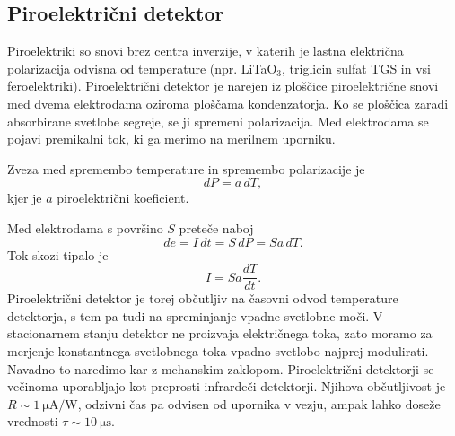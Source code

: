 \subsection*{Piroelektrični detektor}
Piroelektriki so snovi brez centra inverzije, 
v katerih je lastna električna 
polarizacija odvisna od temperature (npr. LiTaO$_3$, 
triglicin sulfat TGS in vsi feroelektriki). Piroelektrični detektor je narejen iz 
ploščice piroelektrične snovi med dvema elektrodama oziroma ploščama kondenzatorja.
Ko se ploščica zaradi absorbirane svetlobe segreje, se ji spremeni polarizacija. Med 
elektrodama se pojavi premikalni tok, ki ga merimo na merilnem uporniku.

Zveza med spremembo temperature in spremembo polarizacije je
\begin{equation}
dP = a\, dT,
\end{equation}
kjer je $a$ piroelektrični koeficient. 

Med elektrodama s površino $S$ preteče naboj
\begin{equation}
de = I\, dt = S\, dP = S a\, dT.
\end{equation}
Tok skozi tipalo je
\begin{equation}
I = S a \frac{dT}{dt}.
\label{piro}
\end{equation}
Piroelektrični detektor je torej občutljiv na časovni odvod temperature detektorja, 
s tem pa tudi na spreminjanje vpadne svetlobne moči. V stacionarnem stanju 
detektor ne proizvaja električnega toka, zato moramo za merjenje 
konstantnega svetlobnega toka vpadno svetlobo najprej modulirati.
Navadno to naredimo kar z mehanskim zaklopom. Piroelektrični detektorji
se večinoma uporabljajo kot preprosti infrardeči detektorji.
Njihova občutljivost je $R \sim 1~\si{\micro\ampere/\watt}$, odzivni čas pa odvisen od 
upornika v vezju, ampak lahko doseže vrednosti $\tau \sim 10~\si{\micro\second}$.

